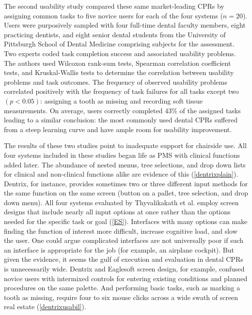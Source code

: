 \documentclass[11pt]{article}
\begin{document}
The second usability study compared\cite{Nielsen1994Enhancing-the-e} these same market-leading CPRs by assigning common tasks to five novice users for each of the four systems ($n = 20$). Users were purposively sampled with four full-time dental faculty members, eight practicing dentists, and eight senior dental students from the University of Pittsburgh School of Dental Medicine comprising subjects for the assessment. Two experts coded task completion success and associated usability problems. The authors used Wilcoxon rank-sum tests, Spearman correlation coefficient tests, and Kruskal-Wallis tests to determine the correlation between usability problems and task outcomes. The frequency of observed usability problems correlated positively with the frequency of task failures for all tasks except two $(p < 0.05)$: assigning a tooth as missing and recording soft tissue measurements. On average, users correctly completed 43\% of the assigned tasks leading to a similar conclusion: the most commonly used dental CPRs suffered from a steep learning curve and have ample room for usability improvement.

The results of these two studies point to inadequate support for chairside use. All four systems included in these studies began life as PMS with clinical functions added later. The abundance of nested menus, tree selections, and drop down lists for clinical and non-clinical functions alike are evidence of this (\ref{dentrixplain}). Dentrix, for instance, provides sometimes two or three different input methods for the same function on the same screen (button on a pallet, tree selection, and drop down menu). All four systems evaluated by Thyvalikakath et al. employ screen designs that include nearly all input options at once rather than the options needed for the specific task or goal (\ref{ES}). Interfaces with many options can make finding the function of interest more difficult, increase cognitive load, and slow the user\cite{Qian2011Towards-develop}. One could argue complicated interfaces are not universally poor if such an interface is appropriate for the job (for example, an airplane cockpit). But given the evidence, it seems the gulf of execution and evaluation \cite{Norman:1989uq} in dental CPRs is unnecessarily wide. Dentrix and Eaglesoft screen design, for example, confused novice users with intermixed controls for entering existing conditions and planned procedures on the same palette. And performing basic tasks, such as marking a tooth as missing, require four to six mouse clicks across a wide swath of screen real estate (\ref{dentrixusabil}). 
\end{document}
